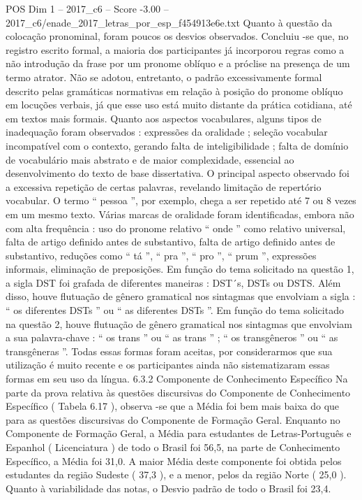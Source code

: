 \begin{textsample}{POS Dim 1 – 2017\_c6 – Score -3.00 – 2017\_c6/enade\_2017\_letras\_por\_esp\_f454913e6e.txt}
Quanto à questão da colocação pronominal, foram poucos os desvios observados.
Concluiu -se que, no registro escrito formal, a maioria dos participantes já incorporou regras como a não introdução da frase por um pronome oblíquo e a próclise na presença de um termo atrator.
Não se adotou, entretanto, o padrão excessivamente formal descrito pelas gramáticas normativas em relação à posição do pronome oblíquo em locuções verbais, já que esse uso está muito distante da prática cotidiana, até em textos mais formais.
Quanto aos aspectos vocabulares, alguns tipos de inadequação foram observados : expressões da oralidade ; seleção vocabular incompatível com o contexto, gerando falta de inteligibilidade ; falta de domínio de vocabulário mais abstrato e de maior complexidade, essencial ao desenvolvimento do texto de base dissertativa.
O principal aspecto observado foi a excessiva repetição de certas palavras, revelando limitação de repertório vocabular.
O termo “ pessoa ”, por exemplo, chega a ser repetido até 7 ou 8 vezes em um mesmo texto.
Várias marcas de oralidade foram identificadas, embora não com alta frequência : uso do pronome relativo “ onde ” como relativo universal, falta de artigo definido antes de substantivo, falta de artigo definido antes de substantivo, reduções como “ tá ”, “ pra ”, “ pro ”, “ prum ”, expressões informais, eliminação de preposições.
Em função do tema solicitado na questão 1, a sigla DST foi grafada de diferentes maneiras : DST´s, DSTs ou DSTS.
Além disso, houve flutuação de gênero gramatical nos sintagmas que envolviam a sigla : “ os diferentes DSTs ” ou “ as diferentes DSTs ”.
Em função do tema solicitado na questão 2, houve flutuação de gênero gramatical nos sintagmas que envolviam a sua palavra-chave : “ os trans ” ou “ as trans ” ; “ os transgêneros ” ou “ as transgêneras ”.
Todas essas formas foram aceitas, por considerarmos que sua utilização é muito recente e os participantes ainda não sistematizaram essas formas em seu uso da língua. 6.3.2 Componente de Conhecimento Específico Na parte da prova relativa às questões discursivas do Componente de Conhecimento Específico ( Tabela 6.17 ), observa -se que a Média foi bem mais baixa do que para as questões discursivas do Componente de Formação Geral.
Enquanto no Componente de Formação Geral, a Média para estudantes de Letras-Português e Espanhol ( Licenciatura ) de todo o Brasil foi 56,5, na parte de Conhecimento Específico, a Média foi 31,0.
A maior Média deste componente foi obtida pelos estudantes da região Sudeste ( 37,3 ), e a menor, pelos da região Norte ( 25,0 ).
Quanto à variabilidade das notas, o Desvio padrão de todo o Brasil foi 23,4.

\end{textsample}
